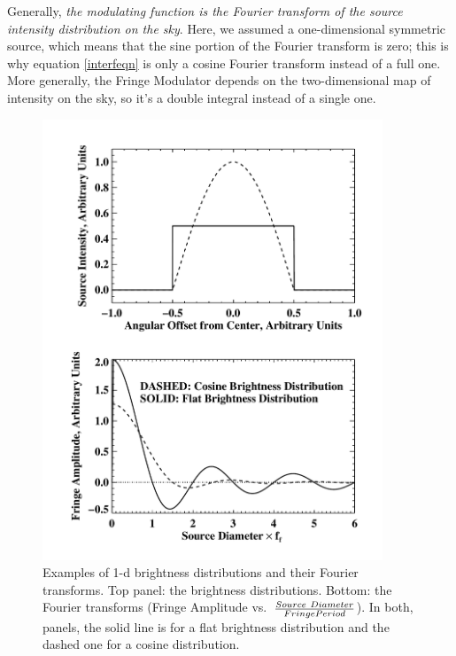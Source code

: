 \documentclass[11pt,preprint]{aastex}
\begin{document}
Generally, {\it the modulating function is the Fourier transform of the
  source intensity distribution on the sky}.  Here, we assumed a
one-dimensional symmetric source, which means that the sine portion of
the Fourier transform is zero; this is why equation \ref{interfeqn} is
only a cosine Fourier transform instead of a full one.  More generally,
the Fringe Modulator depends on the two-dimensional map of intensity on
the sky, so it's a double integral instead of a single one.  
  
\begin{figure}[h!]
\begin{center}
\includegraphics[width=4.0in] {plots/cosfringe.pdf}
\end{center}
                                                                                
\caption{ \footnotesize Examples of 1-d brightness distributions and
  their Fourier transforms. Top panel: the brightness
  distributions. Bottom: the Fourier transforms (Fringe Amplitude
  vs.\ ${Source\ Diameter \over Fringe Period}$). In both, panels, the
  solid line is for a flat brightness distribution and the dashed one
  for a cosine distribution.
\label{cosfringe} } \end{figure}
\end{document}
